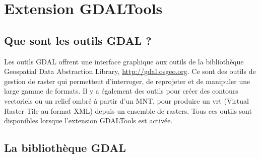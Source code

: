 
\section{Extension GDALTools}\label{label_plugingdaltools}


\subsection{Que sont les outils GDAL ?}\label{whatsgdal}

Les outils GDAL offrent une interface graphique aux outils de la bibliothèque Geospatial Data Abstraction Library, \url{http://gdal.osgeo.org}. Ce sont des outils de gestion de raster qui permettent d'interroger, de reprojeter et de manipuler une large gamme de formats. Il y a également des outils pour créer des contours vectoriels ou un relief ombré à partir d'un MNT, pour produire un vrt (Virtual Raster Tile au format XML) depuis un ensemble de rasters. Tous ces outils sont disponibles lorsque l'extension GDALTools est activée.

\subsection{La bibliothèque GDAL}\label{gdal_lib}

